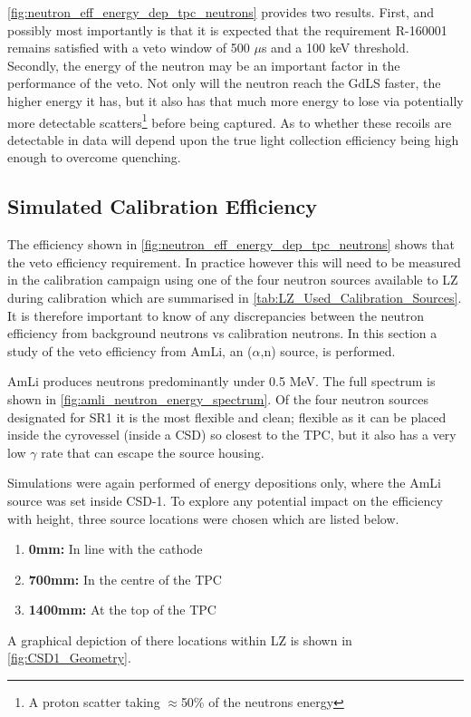 

\par
\autoref{fig:neutron_eff_energy_dep_tpc_neutrons} provides two results.
First, and possibly most importantly is that it is expected that the requirement R-160001 remains satisfied with a veto window of 500 $\mu$s and a 100 keV threshold.
Secondly, the energy of the neutron may be an important factor in the performance of the veto.
Not only will the neutron reach the GdLS faster, the higher energy it has, but it also has that much more energy to lose via potentially more detectable scatters\footnote{A proton scatter taking $\approx$50\% of the neutrons energy} before being captured.
As to whether these recoils are detectable in data will depend upon the true light collection efficiency being high enough to overcome quenching.

\subsection{Simulated Calibration Efficiency}
\par
The efficiency shown in \autoref{fig:neutron_eff_energy_dep_tpc_neutrons} shows that the veto efficiency requirement.
In practice however this will need to be measured in the calibration campaign using one of the four neutron sources available to LZ during calibration which are summarised in \autoref{tab:LZ_Used_Calibration_Sources}.
It is therefore important to know of any discrepancies between the neutron efficiency from background neutrons vs calibration neutrons.
In this section a study of the veto efficiency from AmLi, an ($\alpha$,n) source, is performed.
\par
AmLi produces neutrons predominantly under 0.5 MeV.
The full spectrum is shown in \autoref{fig:amli_neutron_energy_spectrum}.
Of the four neutron sources designated for SR1 it is the most flexible and clean; flexible as it can be placed inside the cyrovessel (inside a CSD) so closest to the TPC, but it also has a very low $\gamma$ rate that can escape the source housing.



\par
Simulations were again performed of energy depositions only, where the AmLi source was set inside CSD-1.
To explore any potential impact on the efficiency with height, three source locations were chosen which are listed below.
\begin{enumerate}
    \item \textbf{0mm:} In line with the cathode
    \item \textbf{700mm:} In the centre of the TPC
    \item \textbf{1400mm:} At the top of the TPC
\end{enumerate}
A graphical depiction of there locations within LZ is shown in \autoref{fig:CSD1_Geometry}. 

